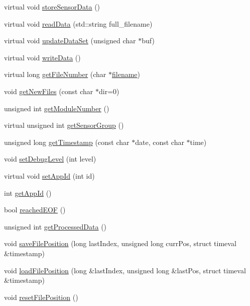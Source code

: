 \begin{DoxyCompactItemize}
virtual void \hyperlink{classDAQDevice_a5262fc7b919829bc439e9eebfc8592e7}{store\-Sensor\-Data} ()
\item 
virtual void \hyperlink{classDAQDevice_a218267a0239e980d418ee5ab70f884e7}{read\-Data} (std\-::string full\-\_\-filename)
\item 
virtual void \hyperlink{classDAQDevice_a06d18d7b372d35c55f8a1a399f582a94}{update\-Data\-Set} (unsigned char $\ast$buf)
\item 
virtual void \hyperlink{classDAQDevice_acdc9d3765b1dfd845f99ec9c93071811}{write\-Data} ()
\item 
virtual long \hyperlink{classDAQDevice_a56a712062b2b17c6a73cb7fb0a475d2e}{get\-File\-Number} (char $\ast$\hyperlink{classDAQDevice_a7f9cda7cf5b41f6b134c313477e9644b}{filename})
\item 
void \hyperlink{classDAQDevice_a8d52a03c722baf86c7279478f31f6e60}{get\-New\-Files} (const char $\ast$dir=0)
\item 
unsigned int \hyperlink{classDAQDevice_ae96988af5ad52d284d3d10dc7e52c351}{get\-Module\-Number} ()
\item 
virtual unsigned int \hyperlink{classDAQDevice_a61d08492a11c30944dfaf3b86115abe8}{get\-Sensor\-Group} ()
\item 
unsigned long \hyperlink{classDAQDevice_a9bc65c78b7855fc29bf80e1dae950109}{get\-Timestamp} (const char $\ast$date, const char $\ast$time)
\item 
void \hyperlink{classDAQDevice_ad62233d33b79371db16f666864fbc83b}{set\-Debug\-Level} (int level)
\item 
virtual void \hyperlink{classDAQDevice_a42934eca41ab337dc5874e9e70ba1fab}{set\-App\-Id} (int id)
\item 
int \hyperlink{classDAQDevice_a176d88638d40c00284fe465344f76f32}{get\-App\-Id} ()
\item 
bool \hyperlink{classDAQDevice_a56426722a8c4ee14d242fd15b49440c5}{reached\-E\-O\-F} ()
\item 
unsigned int \hyperlink{classDAQDevice_a873db9cbaef6c48fb42bbcd4e3d5dc3b}{get\-Processed\-Data} ()
\item 
void \hyperlink{classDAQDevice_acf52574e463497c82a7435190710d198}{save\-File\-Position} (long last\-Index, unsigned long curr\-Pos, struct timeval \&timestamp)
\item 
void \hyperlink{classDAQDevice_a315931693c343f5d6f9b607d406e25ac}{load\-File\-Position} (long \&last\-Index, unsigned long \&last\-Pos, struct timeval \&timestamp)
\item 
void \hyperlink{classDAQDevice_a8aab00baa4f0f0b5718e88539b3d3479}{reset\-File\-Position} ()
\end{DoxyCompactItemize}
